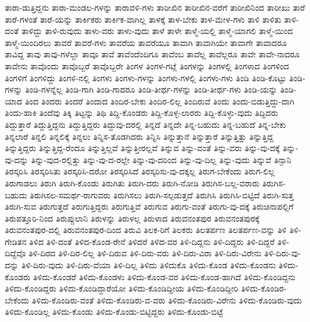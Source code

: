 {ತಾರಾ-ಡುತ್ತಿದ್ದನು
ತಾರಾ-ಮಂಡಲ-ಗಳನ್ನು
ತಾರಾವಳಿ-ಗಳು
ತಾರೀಖಿನ
ತಾರೀಖಿನ-ವರೆಗೆ
ತಾರೀಖಿನಿಂದ
ತಾರೀಖು
ತಾರೆ
ತಾರೆ-ಗಳಂತೆ
ತಾರೆ-ಯನ್ನು
ತಾರ್ಕಿಕರು
ತಾರ್ಕಿಕ-ವಾಗಿಲ್ಲ
ತಾಳಕ್ಕೆ
ತಾಳ-ಬೇಕು
ತಾಳ-ಮೇಳ-ಗಳು
ತಾಳಿ
ತಾಳಿತು
ತಾಳಿ-ದಂತೆ
ತಾಳಿದ್ದು
ತಾಳಿ-ರುವುದು
ತಾಳು-ವರು
ತಾಳು-ವುದು
ತಾಳೆ
ತಾಳೇ
ತಾಳ್ಮೆ-ಯಲ್ಲಿ
ತಾಳ್ಮೆ-ಯಾಗಲಿ
ತಾಳ್ಮೆ-ಯಿಂದ
ತಾಳ್ಮೆ-ಯಿಂದಿರಲು
ತಾವರೆ
ತಾವರೆ-ಗಳು
ತಾವರೆಯ
ತಾವರೆಯೂ
ತಾವಾಗಿ
ತಾವಾಗಿಯೇ
ತಾವಾಗೇ
ತಾವಾದರೂ
ತಾವಿದ್ದ
ತಾವು
ತಾವು-ಗಳೆಲ್ಲಾ
ತಾವೂ
ತಾವೆ
ತಾವೆಂದೆಂದಿಗೂ
ತಾವೆಂಬ
ತಾವೆಲ್ಲ
ತಾವೆಲ್ಲರೂ
ತಾವೇ
ತಾವೇ-ನಾದರೂ
ತಾವೇನು
ತಾವೊಂದು
ತಾವೊಬ್ಬರೆ
ತಾವೊಬ್ಬರೇ
ತಿಂಗಳ
ತಿಂಗಳ-ಗಟ್ಲೆ
ತಿಂಗಳನ್ನು
ತಿಂಗಳಲ್ಲಿ
ತಿಂಗಳಾದ
ತಿಂಗಳಿಂದ
ತಿಂಗಳಿಗೆ
ತಿಂಗಳಿದ್ದು
ತಿಂಗಳಿ-ನಲ್ಲಿ
ತಿಂಗಳು
ತಿಂಗಳು-ಗಳನ್ನು
ತಿಂಗಳು-ಗಳಲ್ಲಿ
ತಿಂಗಳು-ಗಳು
ತಿಂಡಿ
ತಿಂಡಿ-ಕೊಟ್ಟು
ತಿಂಡಿ-ಗಳನ್ನು
ತಿಂಡಿ-ಗಳನ್ನೆಲ್ಲ
ತಿಂಡಿ-ಗಾಗಿ
ತಿಂಡಿ-ಗಾದರೂ
ತಿಂಡಿ-ತೀರ್ಥ-ಗಳನ್ನು
ತಿಂಡಿ-ತೀರ್ಥ-ಗಳು
ತಿಂಡಿ-ಯನ್ನು
ತಿಂಡಿ-ಯಾದ
ತಿಂದ
ತಿಂದರು
ತಿಂದರೆ
ತಿಂದಾದ
ತಿಂದಿರ-ಬೇಕು
ತಿಂದಿರ-ಲಿಲ್ಲ
ತಿಂದಿರುವೆ
ತಿಂದು
ತಿಂದು-ಬಿಡುತ್ತಿದ್ದು-ದಾಗಿ
ತಿಂದು-ಹಾಕಿ
ತಿಂದೆವು
ತಿಕ್ಕಿ
ತಿಟ್ಟನ್ನು
ತಿಥಿ
ತಿದ್ದಿ-ಕೊಂಡರು
ತಿದ್ದಿ-ಕೊಳ್ಳ-ಲಾರರು
ತಿದ್ದಿ-ಕೊಳ್ಳು-ವುದು
ತಿದ್ದಿದರು
ತಿದ್ದುತ್ತಾರೆ
ತಿದ್ದುತ್ತಿದ್ದನು
ತಿದ್ದುತ್ತಿದ್ದರು
ತಿದ್ದುವು-ದರಲ್ಲಿ
ತಿನ್ನದೆ
ತಿನ್ನದೇ
ತಿನ್ನ-ಬಹುದು
ತಿನ್ನ-ಬಹುದೆ
ತಿನ್ನ-ಬೇಕು
ತಿನ್ನಲಾರೆ
ತಿನ್ನಲಿ
ತಿನ್ನಲಿಕ್ಕೆ
ತಿನ್ನಲು
ತಿನ್ನಿಸ-ತೊಡಗಿದರು
ತಿನ್ನಿಸಿ
ತಿನ್ನುತ್ತಾನೆ
ತಿನ್ನುತ್ತಾರೆ
ತಿನ್ನುತ್ತಿತ್ತು
ತಿನ್ನುತ್ತಿದ್ದ
ತಿನ್ನುತ್ತಿದ್ದರು
ತಿನ್ನುತ್ತಿದ್ದ-ರೆಂದೂ
ತಿನ್ನುತ್ತಿಲ್ಲವೆ
ತಿನ್ನುತ್ತೀರಲ್ಲವೆ
ತಿನ್ನುವ
ತಿನ್ನು-ವಂತೆ
ತಿನ್ನು-ವರು
ತಿನ್ನು-ವು-ದಕ್ಕೆ
ತಿನ್ನು-ವು-ದನ್ನು
ತಿನ್ನು-ವುದ-ರಲ್ಲಿತ್ತು
ತಿನ್ನು-ವು-ದ-ರಲ್ಲೇ
ತಿನ್ನು-ವು-ದರಿಂದ
ತಿನ್ನು-ವು-ದಿಲ್ಲ
ತಿನ್ನು-ವುದು
ತಿನ್ನುವೆ
ತಿನ್ಪಾನಿ
ತಿರಸ್ಕರಿಸಿ
ತಿರಸ್ಕರಿಸಿತು
ತಿರಸ್ಕರಿಸಿ-ದರೋ
ತಿರಸ್ಕರಿಸಿದೆ
ತಿರಸ್ಕರಿಸು-ವು-ದಕ್ಕಲ್ಲ
ತಿರುಗ-ಬೇಕೆಂದು
ತಿರುಗ-ಲಿಲ್ಲ
ತಿರುಗಾಡಲು
ತಿರುಗಿ
ತಿರುಗಿ-ಕೊಂಡು
ತಿರುಗಿತು
ತಿರುಗಿ-ದರು
ತಿರುಗಿ-ನೋಡಿ
ತಿರುಗಿಸ-ಬಲ್ಲ-ವರಾರು
ತಿರುಗಿಸ-ಬಹುದು
ತಿರುಗಿಸಲ-ಸಮರ್ಥ-ರಾಗುವರು
ತಿರುಗಿಸಲು
ತಿರುಗಿ-ಸಲ್ಪಡುತ್ತದೆ
ತಿರುಗಿಸಿ
ತಿರುಗಿಸಿ-ಬಿಟ್ಟಿದೆ
ತಿರುಗಿ-ಸುತ್ತ
ತಿರುಗಿ-ಸುವ
ತಿರುಗುತ್ತದೆ
ತಿರುಗುತ್ತಿದ್ದರು
ತಿರುಗುತ್ತಿವೆ
ತಿರುಗುವ
ತಿರುಗು-ವಂತೆ
ತಿರುಗು-ವು-ದಕ್ಕೆ
ತಿರುಚಿನಾಪಲ್ಲಿಗೆ
ತಿರುಪತ್ತೂರಿ-ನಿಂದ
ತಿರುಪ್ಪುಲಾನಿ
ತಿರುಳನ್ನು
ತಿರುಳಲ್ಲ
ತಿರುಳಾದ
ತಿರುವನಂತಪುರ
ತಿರುವನಂತಪುರಕ್ಕೆ
ತಿರುವನಂತಪುರ-ದಲ್ಲಿ
ತಿರುವನಂತಪುರ-ದಿಂದ
ತಿರುವಿ
ತಿಲಕ-ರಿಗೆ
ತಿಲಕರು
ತಿಲತರ್ಪಣ
ತಿಲತರ್ಪಣ-ವನ್ನು
ತಿಳಿ
ತಿಳಿ-ಗೇಡಿತನ
ತಿಳಿದ
ತಿಳಿ-ದಂತೆ
ತಿಳಿದ-ಕೊಂಡ-ರೇನೆ
ತಿಳಿದರೆ
ತಿಳಿದ-ವರ
ತಿಳಿ-ದಿದ್ದನು
ತಿಳಿ-ದಿದ್ದರು
ತಿಳಿ-ದಿದ್ದರೆ
ತಿಳಿ-ದಿದ್ದೆವೊ
ತಿಳಿ-ದಿರದ
ತಿಳಿ-ದಿರ-ಲಿಲ್ಲ
ತಿಳಿ-ದಿರುವ
ತಿಳಿ-ದಿರು-ವರು
ತಿಳಿ-ದಿರು-ವಿರಾ
ತಿಳಿ-ದಿರು-ವಿರೇನು
ತಿಳಿ-ದಿರು-ವು-ದನ್ನು
ತಿಳಿ-ದಿರು-ವುದು
ತಿಳಿ-ದಿರು-ವೆಯಾ
ತಿಳಿ-ದಿಲ್ಲ
ತಿಳಿದು
ತಿಳಿದುಕೊ
ತಿಳಿದು-ಕೊಂಡ
ತಿಳಿದು-ಕೊಂಡನು
ತಿಳಿದು-ಕೊಂಡರು
ತಿಳಿದು-ಕೊಂಡರೆ
ತಿಳಿದು-ಕೊಂಡಳು
ತಿಳಿದು-ಕೊಂಡ-ವರ
ತಿಳಿದು-ಕೊಂಡ-ಹಾಗಿದೆ
ತಿಳಿದು-ಕೊಂಡಿದ್ದನು
ತಿಳಿದು-ಕೊಂಡಿದ್ದರು
ತಿಳಿದು-ಕೊಂಡಿದ್ದಾರೆಯೋ
ತಿಳಿದು-ಕೊಂಡಿದ್ದೀಯ
ತಿಳಿದು-ಕೊಂಡಿದ್ದೀರಿ
ತಿಳಿದು-ಕೊಂಡಿರ-ಬೇಕೆಂದು
ತಿಳಿದು-ಕೊಂಡಿರು-ವಂತೆ
ತಿಳಿದು-ಕೊಂಡಿರು-ವ-ವರು
ತಿಳಿದು-ಕೊಂಡಿರು-ವಿರೇನು
ತಿಳಿದು-ಕೊಂಡಿರು-ವುದು
ತಿಳಿದು-ಕೊಂಡಿಲ್ಲ
ತಿಳಿದು-ಕೊಂಡು
ತಿಳಿದು-ಕೊಂಡು-ಬಿಟ್ಟಿದ್ದರು
ತಿಳಿದು-ಕೊಂಡು-ಬಿಟ್ಟೆ
}
